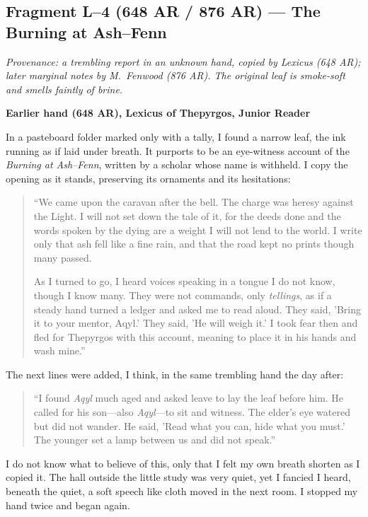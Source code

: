 \documentclass[11pt]{article}
\begin{document}
\subsection{Fragment L--4 (648 AR / 876 AR) --- The Burning at Ash--Fenn}
\label{frag:l4}
{}

\noindent\textit{Provenance: a trembling report in an unknown hand, copied by Lexicus (648 AR); later marginal notes by M.\ Fenwood (876 AR). The original leaf is smoke-soft and smells faintly of brine.}

\medskip
\noindent\textbf{Earlier hand (648 AR), Lexicus of Thepyrgos, Junior Reader}

In a pasteboard folder marked only with a tally, I found a narrow leaf, the ink running as if laid under breath. It purports to be an eye-witness account of the \textit{Burning at Ash--Fenn}, written by a scholar whose name is withheld. I copy the opening as it stands, preserving its ornaments and its hesitations:

\begin{quote}\small
``We came upon the caravan after the bell. The charge was heresy against the Light. I will not set down the tale of it, for the deeds done and the words spoken by the dying are a weight I will not lend to the world. I write only that ash fell like a fine rain, and that the road kept no prints though many passed. 

As I turned to go, I heard voices speaking in a tongue I do not know, though I know many. They were not commands, only \emph{tellings}, as if a steady hand turned a ledger and asked me to read aloud. They said, 'Bring it to your mentor, Aqyl.' They said, 'He will weigh it.' I took fear then and fled for Thepyrgos with this account, meaning to place it in his hands and wash mine.''
\end{quote}

The next lines were added, I think, in the same trembling hand the day after:

\begin{quote}\small
``I found \textit{Aqyl} much aged and asked leave to lay the leaf before him. He called for his son---also \textit{Aqyl}---to sit and witness. The elder's eye watered but did not wander. He said, 'Read what you can, hide what you must.' The younger set a lamp between us and did not speak.''
\end{quote}

I do not know what to believe of this, only that I felt my own breath shorten as I copied it. The hall outside the little study was very quiet, yet I fancied I heard, beneath the quiet, a soft speech like cloth moved in the next room. I stopped my hand twice and began again.
\end{document}

